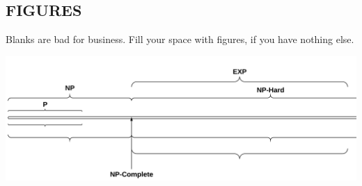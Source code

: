 \documentclass[landscape]{sciposter}
\begin{document}
\begin{multicols}{4}

\section{FIGURES}
Blanks are bad for business. Fill your space with figures, if you have nothing else.


\begin{center}
\includegraphics[scale=.8]{Time_Complexity_Line.png}
\end{center}


\end{multicols}
\end{document}
